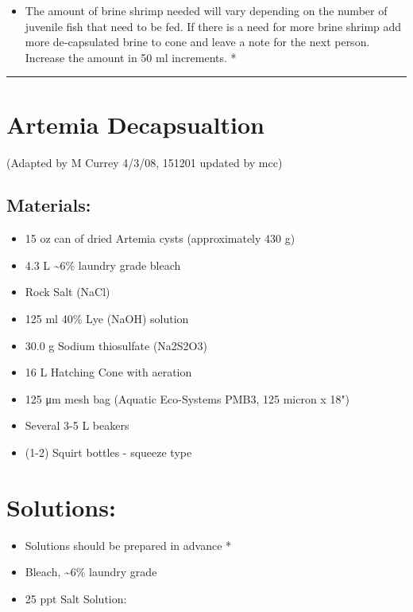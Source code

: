 \documentclass[
]{book}
\providecommand{\tightlist}{%
  \setlength{\itemsep}{0pt}\setlength{\parskip}{0pt}}
\begin{document}
\begin{itemize}
\tightlist
\item
  The amount of brine shrimp needed will vary depending on the number of juvenile fish that need to be fed. If there is a need for more brine shrimp add more de-capsulated brine to cone and leave a note for the next person. Increase the amount in 50 ml increments. *
\end{itemize}

\begin{center}\rule{0.5\linewidth}{0.5pt}\end{center}

\hypertarget{artemia-decapsualtion}{%
\section{Artemia Decapsualtion}\label{artemia-decapsualtion}}

(Adapted by M Currey 4/3/08, 151201 updated by mcc)

\hypertarget{materials-2}{%
\subsection{Materials:}\label{materials-2}}

\begin{itemize}
\tightlist
\item
  15 oz can of dried Artemia cysts (approximately 430 g)
\item
  4.3 L \textasciitilde6\% laundry grade bleach
\item
  Rock Salt (NaCl)
\item
  125 ml 40\% Lye (NaOH) solution
\item
  30.0 g Sodium thiosulfate (Na2S2O3)
\item
  16 L Hatching Cone with aeration
\item
  125 μm mesh bag (Aquatic Eco-Systems PMB3, 125 micron x 18")
\item
  Several 3-5 L beakers
\item
  (1-2) Squirt bottles - squeeze type
\end{itemize}

\hypertarget{solutions-1}{%
\section{Solutions:}\label{solutions-1}}

\begin{itemize}
\item
  Solutions should be prepared in advance *
\item
  Bleach, \textasciitilde6\% laundry grade
\item
  25 ppt Salt Solution:
\end{itemize}
\end{document}
